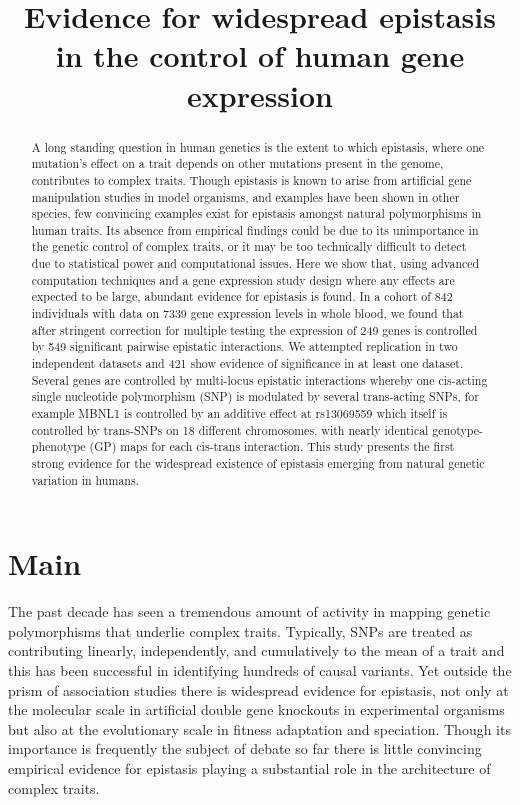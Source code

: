 \documentclass{article}
\title{Evidence for widespread epistasis in the control of human gene expression}
\begin{document}
\maketitle


\begin{abstract}
A long standing question in human genetics is the extent to which epistasis, where one mutation's effect on a trait depends on other mutations present in the genome, contributes to complex traits. Though epistasis is known to arise from artificial gene manipulation studies in model organisms, and examples have been shown in other species, few convincing examples exist for epistasis amongst natural polymorphisms in human traits. Its absence from empirical findings could be due to its unimportance in the genetic control of complex traits, or it may be too technically difficult to detect due to statistical power and computational issues. Here we show that, using advanced computation techniques and a gene expression study design where any effects are expected to be large, abundant evidence for epistasis is found. In a cohort of 842 individuals with data on 7339 gene expression levels in whole blood, we found that after stringent correction for multiple testing the expression of 249 genes is controlled by 549 significant pairwise epistatic interactions. We attempted replication in two independent datasets and 421 show evidence of significance in at least one dataset. Several genes are controlled by multi-locus epistatic interactions whereby one cis-acting single nucleotide polymorphism (SNP) is modulated by several trans-acting SNPs, for example MBNL1 is controlled by an additive effect at rs13069559 which itself is controlled by trans-SNPs on 18 different chromosomes, with nearly identical genotype-phenotype (GP) maps for each cis-trans interaction. This study presents the first strong evidence for the widespread existence of epistasis emerging from natural genetic variation in humans.
\end{abstract}


\section{Main}

The past decade has seen a tremendous amount of activity in mapping genetic polymorphisms that underlie complex traits. Typically, SNPs are treated as contributing linearly, independently, and cumulatively to the mean of a trait and this has been successful in identifying hundreds of causal variants. Yet outside the prism of association studies there is widespread evidence for epistasis, not only at the molecular scale in artificial double gene knockouts in experimental organisms but also at the evolutionary scale in fitness adaptation and speciation. Though its importance is frequently the subject of debate so far there is little convincing empirical evidence for epistasis playing a substantial role in the architecture of complex traits.
\end{document}
